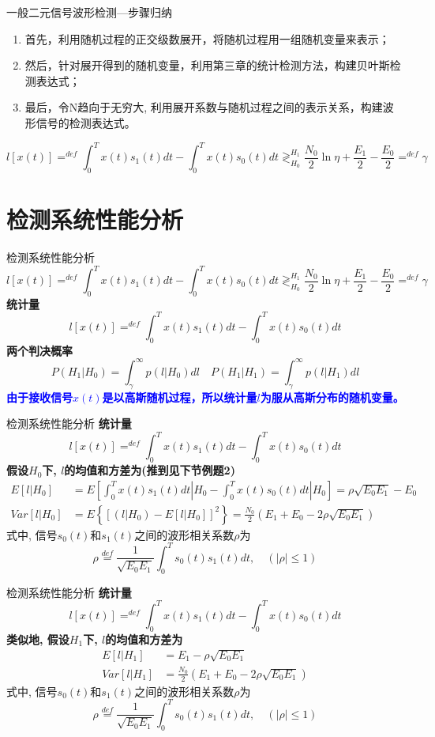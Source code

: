 \begin{frame}{一般二元信号波形检测---步骤归纳}
\begin{enumerate}
	\setlength{\itemsep}{.5cm}
	\item 首先，利用随机过程的正交级数展开，将随机过程用一组随机变量来表示；
	\item 然后，针对展开得到的随机变量，利用第三章的统计检测方法，构建贝叶斯检测表达式；
	\item 最后，令N趋向于无穷大, 利用展开系数与随机过程之间的表示关系，构建波形信号的检测表达式。
\end{enumerate}
\[l[x(t)]\mathop{=}^{def}\int_{0}^{T}x(t)s_1(t)dt-\int_{0}^{T}x(t)s_0(t)dt\mathop{\gtrless}_{H_0}^{H_1}\frac{N_0}{2}\ln\eta+\frac{E_1}{2}-\frac{E_0}{2}\mathop{=}^{def}\gamma \]
\end{frame}

\section{检测系统性能分析}

\begin{frame}{检测系统性能分析}
\[l[x(t)]\mathop{=}^{def}\int_{0}^{T}x(t)s_1(t)dt-\int_{0}^{T}x(t)s_0(t)dt\mathop{\gtrless}_{H_0}^{H_1}\frac{N_0}{2}\ln\eta+\frac{E_1}{2}-\frac{E_0}{2}\mathop{=}^{def}\gamma \]
\textbf{统计量}
\[l[x(t)]\mathop{=}^{def}\int_{0}^{T}x(t)s_1(t)dt-\int_{0}^{T}x(t)s_0(t)dt\]
\textbf{两个判决概率}
\[P(H_1|H_0)=\int_{\gamma}^{\infty}p(l|H_0)dl\quad P(H_1|H_1)=\int_{\gamma}^{\infty}p(l|H_1)dl \]
\textbf{\textcolor{blue}{由于接收信号$x(t)$是以高斯随机过程，所以统计量$l$为服从高斯分布的随机变量。}}
\end{frame}

\begin{frame}{检测系统性能分析}
\textbf{统计量}
\[l[x(t)]\mathop{=}^{def}\int_{0}^{T}x(t)s_1(t)dt-\int_{0}^{T}x(t)s_0(t)dt\]
\textbf{假设$H_0$下, $l$的均值和方差为(推到见下节例题2)}
\begin{align*}
E[l|H_0]&=E\left[\int_{0}^{T}x(t)s_1(t)dt|H_0-\int_{0}^{T}x(t)s_0(t)dt|H_0\right]=\rho\sqrt{E_0E_1}-E_0\\
Var[l|H_0]&=E\left\{\left[(l|H_0)-E[l|H_0]\right]^2\right\}=\frac{N_0}{2}(E_1+E_0-2\rho\sqrt{E_0E_1})
\end{align*}
式中, 信号$s_0(t)$和$s_1(t)$之间的波形相关系数$\rho$为 \[\rho\mathop{=}\limits^{def}\frac{1}{\sqrt{E_{0}E_{1}}}\int_{0}^{T}s_0(t)s_1(t)dt,\quad(|\rho|\le 1)\]
\end{frame}

\begin{frame}{检测系统性能分析}
\textbf{统计量}
\[l[x(t)]\mathop{=}^{def}\int_{0}^{T}x(t)s_1(t)dt-\int_{0}^{T}x(t)s_0(t)dt\]
\textbf{类似地, 假设$H_1$下, $l$的均值和方差为}
\begin{align*}
E[l|H_1]&=E_1-\rho\sqrt{E_0E_1}\\
Var[l|H_1]&=\frac{N_0}{2}(E_1+E_0-2\rho\sqrt{E_0E_1})
\end{align*}
式中, 信号$s_0(t)$和$s_1(t)$之间的波形相关系数$\rho$为 \[\rho\mathop{=}\limits^{def}\frac{1}{\sqrt{E_{0}E_{1}}}\int_{0}^{T}s_0(t)s_1(t)dt,\quad(|\rho|\le 1)\]
\end{frame}

